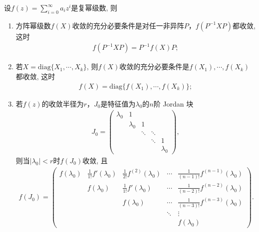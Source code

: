 \documentclass[../../main.tex]{subfiles}
\begin{document}
\begin{theorem}\label{theorem:方阵幂级数收敛的条件}
设\(f(z)=\sum_{i = 0}^{\infty}a_{i}z^{i}\)是复幂级数, 则
\begin{enumerate}[(1)]
\item 方阵幂级数\(f(X)\)收敛的充分必要条件是对任一非异阵\(P\)，\(f(P^{-1}XP)\)都收敛, 这时
\begin{align*}
f(P^{-1}XP) = P^{-1}f(X)P;
\end{align*}

\item 若\(X = \mathrm{diag}\{X_1,\cdots,X_k\}\), 则\(f(X)\)收敛的充分必要条件是\(f(X_1),\cdots,f(X_k)\)都收敛, 这时
\begin{align*}
f(X) = \mathrm{diag}\{f(X_1),\cdots,f(X_k)\};
\end{align*}

\item 若\(f(z)\)的收敛半径为\(r\)，\(J_0\)是特征值为\(\lambda_0\)的\(n\)阶 Jordan 块
\begin{align*}
J_0 = \begin{pmatrix}
\lambda_0 & 1 & & \\
 & \lambda_0 & 1 & \\
 & & \ddots & \ddots \\
 & & & \ddots & 1 \\
 & & & & \lambda_0
\end{pmatrix},
\end{align*}
则当\(|\lambda_0| < r\)时\(f(J_0)\)收敛, 且
\begin{align}\label{equation:::::7.8.6}
f(J_0) = \begin{pmatrix}
f(\lambda_0) & \frac{1}{1!}f'(\lambda_0) & \frac{1}{2!}f^{(2)}(\lambda_0) & \cdots & \frac{1}{(n - 1)!}f^{(n - 1)}(\lambda_0) \\
 & f(\lambda_0) & \frac{1}{1!}f'(\lambda_0) & \cdots & \frac{1}{(n - 2)!}f^{(n - 2)}(\lambda_0) \\
 & & f(\lambda_0) & \cdots & \frac{1}{(n - 3)!}f^{(n - 3)}(\lambda_0) \\
 & & & \ddots & \vdots \\
 & & & & f(\lambda_0)
\end{pmatrix}.
\end{align} 
\end{enumerate}
\end{theorem}
\end{document}
